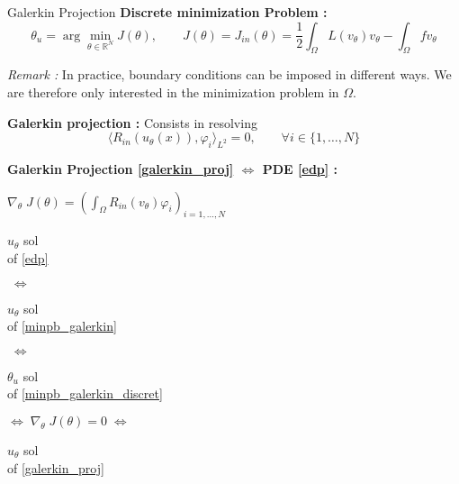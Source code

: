 \begin{frame}{Galerkin Projection}
	\textbf{Discrete minimization Problem :}
	\begin{equation}
		\theta_u=\arg\min_{\theta\in\mathbb{R}^N} J(\theta), \qquad J(\theta)=J_{in}(\theta)=\frac{1}{2}\int_\Omega L(v_\theta)v_\theta - \int_\Omega fv_\theta \label{minpb_galerkin_discret}
	\end{equation}
%		
	
	\footnotesize	
	\textit{Remark :} In practice, boundary conditions can be imposed in different ways. We are therefore only interested in the minimization problem in $\Omega$.
	
	\normalsize	
	
	\textbf{Galerkin projection :} Consists in resolving
	\begin{equation}
		\langle R_{in}(u_\theta(x)),\varphi_i\rangle_{L^2}=0, \qquad \forall i\in\{1,\dots,N\}\label{galerkin_proj}
	\end{equation}

	\footnotesize
	\begin{center}
		\begin{tcolorbox}[
			colback=white, %
			colframe=other, %
			arc=2mm, %
			boxrule=0.5pt, %
			breakable, enhanced jigsaw,
			width=\linewidth
			]
			
			\textbf{Galerkin Projection \eqref{galerkin_proj} $\Leftrightarrow$ PDE \eqref{edp} :}
			
			\centering
			$\nabla_\theta \; J(\theta)=\left(\int_\Omega R_{in}(v_\theta)\varphi_i\right)_{i=1,\dots,N} \qquad $  
			
			\vspace{5pt}
			
			\begin{minipage}{0.1\linewidth}
				\centering
				$u_\theta$ sol \\
				of \eqref{edp}
			\end{minipage} $\; \Leftrightarrow \;$	\begin{minipage}{0.1\linewidth}
				\centering
				$u_\theta$ sol \\
				of \eqref{minpb_galerkin}
			\end{minipage} $\; \Leftrightarrow \;$	\begin{minipage}{0.1\linewidth}
				\centering
				$\theta_u$ sol \\
				of \eqref{minpb_galerkin_discret}
			\end{minipage} $\Leftrightarrow \; \nabla_\theta \; J(\theta)=0 \; \Leftrightarrow$ \begin{minipage}{0.1\linewidth}
				\centering
				$u_\theta$ sol \\
				of \eqref{galerkin_proj}
			\end{minipage}
		

\end{tcolorbox}
\end{center}
\end{frame}

